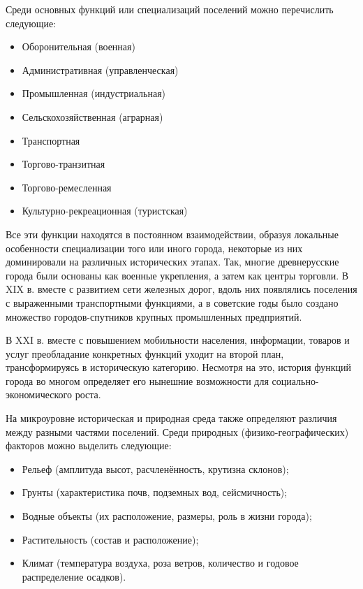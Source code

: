 \documentclass[
  11pt,
]{book}
\providecommand{\tightlist}{%
  \setlength{\itemsep}{0pt}\setlength{\parskip}{0pt}}
\begin{document}
Среди основных функций или специализаций поселений можно перечислить следующие:

\begin{itemize}
\tightlist
\item
  Оборонительная (военная)
\item
  Административная (управленческая)
\item
  Промышленная (индустриальная)
\item
  Сельскохозяйственная (аграрная)
\item
  Транспортная
\item
  Торгово-транзитная
\item
  Торгово-ремесленная
\item
  Культурно-рекреационная (туристская)
\end{itemize}

Все эти функции находятся в постоянном взаимодействии, образуя локальные особенности специализации того или иного города, некоторые из них доминировали на различных исторических этапах. Так, многие древнерусские города были основаны как военные укрепления, а затем как центры торговли. В XIX в. вместе с развитием сети железных дорог, вдоль них появлялись поселения с выраженными транспортными функциями, а в советские годы было создано множество городов-спутников крупных промышленных предприятий.

В XXI в. вместе с повышением мобильности населения, информации, товаров и услуг преобладание конкретных функций уходит на второй план, трансформируясь в историческую категорию. Несмотря на это, история функций города во многом определяет его нынешние возможности для социально-экономического роста.

На микроуровне историческая и природная среда также определяют различия между разными частями поселений. Среди природных (физико-географических) факторов можно выделить следующие:

\begin{itemize}
\tightlist
\item
  Рельеф (амплитуда высот, расчленённость, крутизна склонов);
\item
  Грунты (характеристика почв, подземных вод, сейсмичность);
\item
  Водные объекты (их расположение, размеры, роль в жизни города);
\item
  Растительность (состав и расположение);
\item
  Климат (температура воздуха, роза ветров, количество и годовое распределение осадков).
\end{itemize}
\end{document}
